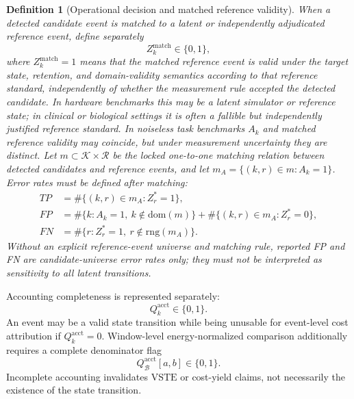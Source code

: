 \documentclass[11pt,a4paper]{article}
\newtheorem{definition}{Definition}
\newcommand{\VSTE}{\ensuremath{\mathrm{VSTE}}}
\newcommand{\1}{\mathbf{1}}
\begin{document}
\begin{definition}[Operational decision and matched reference validity]
When a detected candidate event is matched to a latent or independently adjudicated reference event, define separately
\[
  Z^{\mathrm{match}}_k\in\{0,1\},
\]
where $Z^{\mathrm{match}}_k=1$ means that the matched reference event is valid under the target state, retention, and domain-validity semantics according to that reference standard, independently of whether the measurement rule accepted the detected candidate. In hardware benchmarks this may be a latent simulator or reference state; in clinical or biological settings it is often a fallible but independently justified reference standard. In noiseless task benchmarks $A_k$ and matched reference validity may coincide, but under measurement uncertainty they are distinct. Let $m\subset\mathcal{K}\times\mathcal{R}$ be the locked one-to-one matching relation between detected candidates and reference events, and let $m_A=\{(k,r)\in m:A_k=1\}$. Error rates must be defined after matching:
\begin{align}
  TP &= \#\{(k,r)\in m_A:Z_r^\ast=1\},\\
  FP &= \#\{k:A_k=1,\ k\notin\mathrm{dom}(m)\}
        +\#\{(k,r)\in m_A:Z_r^\ast=0\},\\
  FN &= \#\{r:Z_r^\ast=1,\ r\notin\mathrm{rng}(m_A)\}.
\end{align}
Without an explicit reference-event universe and matching rule, reported FP and FN are candidate-universe error rates only; they must not be interpreted as sensitivity to all latent transitions.
\end{definition}

Accounting completeness is represented separately:
\[
  Q^{\mathrm{acct}}_k\in\{0,1\}.
\]
An event may be a valid state transition while being unusable for event-level cost attribution if $Q^{\mathrm{acct}}_k=0$. Window-level energy-normalized comparison additionally requires a complete denominator flag
\[
  Q_{\mathcal{B}}^{\mathrm{acct}}[a,b]\in\{0,1\}.
\]
Incomplete accounting invalidates \VSTE{} or cost-yield claims, not necessarily the existence of the state transition.
\end{document}
